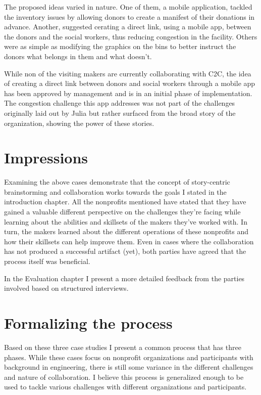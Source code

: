 The proposed ideas varied in nature. One of them, a mobile application, tackled the inventory issues by allowing donors to create a manifest of their donations in advance. Another, suggested cerating a direct link, using a mobile app, between the donors and the social workers, thus reducing congestion in the facility. Others were as simple as modifying the graphics on the bins to better instruct the donors what belongs in them and what doesn't. 

While non of the visiting makers are currently collaborating with C2C, the idea of creating a direct link between donors and social workers through a mobile app has been approved by management and is in an initial phase of implementation. The congestion challenge this app addresses was not part of the challenges originally laid out by Julia but rather surfaced from the broad story of the organization, showing the power of these stories.  

\section{Impressions}

Examining the above cases demonstrate that the concept of story-centric brainstorming and collaboration works towards the goals I stated in the introduction chapter. All the nonprofits mentioned have stated that they have gained a valuable different perspective on the challenges they're facing while learning about the abilities and skillsets of the makers they've worked with. In turn, the makers learned about the different operations of these nonprofits and how their skillsets can help improve them. Even in cases where the collaboration has not produced a successful artifact (yet), both parties have agreed that the process itself was beneficial.

In the Evaluation chapter I present a more detailed feedback from the parties involved based on structured interviews. 

\section{Formalizing the process}

Based on these three case studies I present a common process that has three phases. While these cases focus on nonprofit organizations and participants with background in engineering, there is still some variance in the different challenges and nature of collaboration. I believe this process is generalized enough to be used to tackle various challenges with different organizations and participants. 

